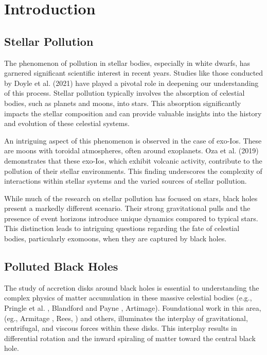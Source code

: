 \documentclass[journal,article,submit,pdftex,moreauthors]{Definitions/mdpi}
\begin{document}


\section{Introduction}
\subsection{Stellar Pollution}

The phenomenon of pollution in stellar bodies, especially in white dwarfs, has garnered significant scientific interest in recent years. Studies like those conducted by Doyle et al. (2021) \cite{Doyle_2021} have played a pivotal role in deepening our understanding of this process. Stellar pollution typically involves the absorption of celestial bodies, such as planets and moons, into stars. This absorption significantly impacts the stellar composition and can provide valuable insights into the history and evolution of these celestial systems.

An intriguing aspect of this phenomenon is observed in the case of exo-Ios. These are moons with toroidal atmospheres, often around exoplanets. Oza et al. (2019) \cite{Oza_2019} demonstrates that these exo-Ios, which exhibit volcanic activity, contribute to the pollution of their stellar environments. This finding underscores the complexity of interactions within stellar systems and the varied sources of stellar pollution.

While much of the research on stellar pollution has focused on stars, black holes present a markedly different scenario. Their strong gravitational pulls and the presence of event horizons introduce unique dynamics compared to typical stars. This distinction leads to intriguing questions regarding the fate of celestial bodies, particularly exomoons, when they are captured by black holes.
\subsection{Polluted Black Holes}

The study of accretion disks around black holes is essential to understanding the complex physics of matter accumulation in these massive celestial bodies (e.g., Pringle et al. \cite{Pringle_1981}, Blandford and Payne \cite{Blandford_Payne_1982}, Artimage\cite{Armitage_2004}). Foundational work in this area, (eg., Armitage \cite{Armitage_2004}, Rees, \cite{Rees_1988}) and others, illuminates the interplay of gravitational, centrifugal, and viscous forces within these disks. This interplay results in differential rotation and the inward spiraling of matter toward the central black hole.
\end{document}
